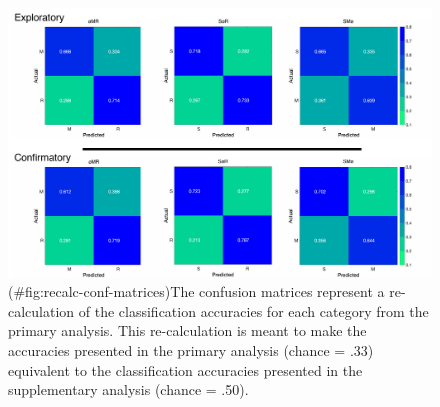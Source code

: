 \begin{appendix}
\begin{figure}
\centering
\includegraphics{figures/supp_analysis/recalculations/confusion_matrices/recalc_conf_matrices.pdf}
\caption{(\#fig:recalc-conf-matrices)The confusion matrices represent a
re-calculation of the classification accuracies for each category from
the primary analysis. This re-calculation is meant to make the
accuracies presented in the primary analysis (chance = .33) equivalent
to the classification accuracies presented in the supplementary analysis
(chance = .50).}
\end{figure}
\end{appendix}
